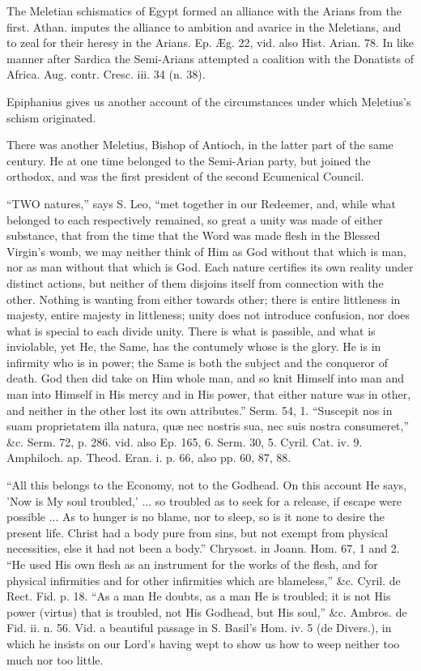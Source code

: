 The
Meletian schismatics of Egypt formed an alliance with the Arians from
the first. Athan. imputes the alliance to ambition and avarice in the
Meletians, and to zeal for their heresy in the Arians. Ep. Æg. 22,
vid. also Hist. Arian. 78. In like manner after Sardica the
Semi-Arians attempted a coalition with the Donatists of Africa. Aug.
contr. Cresc. iii. 34 (n. 38).

Epiphanius
gives us another account of the circumstances under which Meletius's
schism originated.

There
was another Meletius, Bishop of Antioch, in the latter part of the
same century. He at one time belonged to the Semi-Arian party, but
joined the orthodox, and was the first president of the second
Ecumenical Council.


``TWO
natures,'' says S. Leo, ``met together in our Redeemer, and, while what
belonged to each respectively remained, so great a unity was made of
either substance, that from the time that the Word was made flesh in
the Blessed Virgin's womb, we may neither think of Him as God without
that which is man, nor as man without that which is God. Each nature
certifies its own reality under distinct actions, but neither of them
disjoins itself from connection with the other. Nothing is wanting
from either towards other; there is entire littleness in majesty,
entire majesty in littleness; unity does not introduce confusion, nor
does what is special to each divide unity. There is what is passible,
and what is inviolable, yet He, the Same, has the contumely whose is
the glory. He is in infirmity who is in power; the Same is both the
subject and the conqueror of death. God then did take on Him whole
man, and so knit Himself into man and man into Himself in His mercy
and in His power, that either nature was in other, and neither in the
other lost its own attributes.'' Serm. 54, 1. ``Suscepit nos in suam
proprietatem illa natura, quæ nec nostris sua, nec suis nostra
consumeret,'' \&c. Serm. 72, p. 286. vid. also Ep. 165, 6. Serm. 30,
5. Cyril. Cat. iv. 9. Amphiloch. ap. Theod. Eran. i. p. 66, also pp.
60, 87, 88.

``All
this belongs to the Economy, not to the Godhead. On this account He
says, 'Now is My soul troubled,' ... so troubled as to seek for
a release, if escape were possible ... As to hunger is no blame, nor
to sleep, so is it none to desire the present life. Christ had a body
pure from sins, but not exempt from physical necessities, else it had
not been a body.'' Chrysost. in Joann. Hom. 67, 1 and 2. ``He used His
own flesh as an instrument for the works of the flesh, and for
physical infirmities and for other infirmities which are blameless,''
\&c. Cyril. de Rect. Fid. p. 18. ``As a man He doubts, as a man He
is troubled; it is not His power (virtus) that is troubled, not His
Godhead, but His soul,'' \&c. Ambros. de Fid. ii. n. 56. Vid. a
beautiful passage in S. Basil's Hom. iv. 5 (de Divers.), in which he
insists on our Lord's having wept to show us how to weep neither too
much nor too little.

